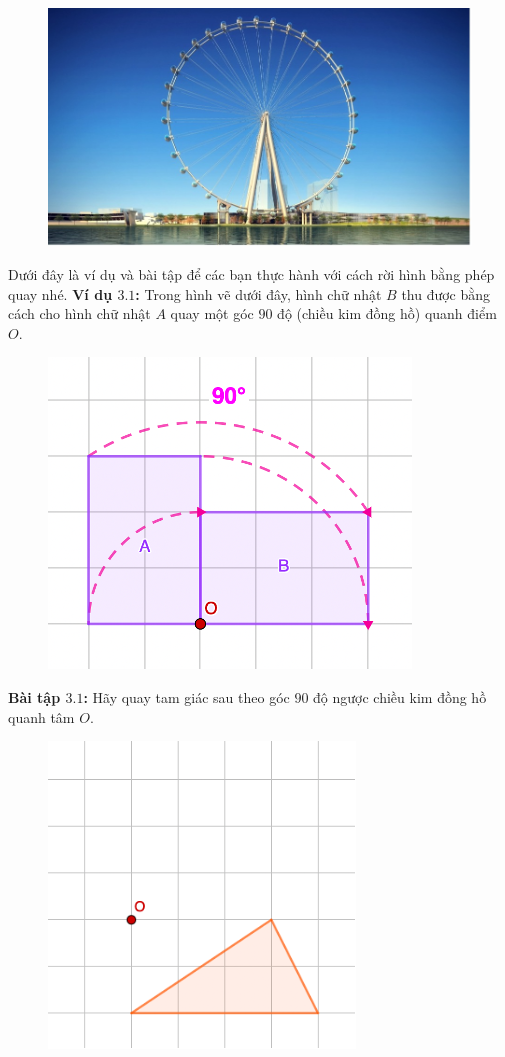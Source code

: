 \begin{multicols}{2}
\begin{figure}[H]
		\includegraphics[width= 0.99\linewidth]{Picture25}
		\vspace*{-10pt}
	\end{figure}
	Dưới đây là ví dụ và bài tập để các bạn thực hành với cách rời hình bằng phép quay nhé.
	\vskip 0.1cm
	\textbf{\color{toancuabi}Ví dụ $\pmb{3.1}$:} Trong hình vẽ dưới đây, hình chữ nhật $B$ thu được bằng cách cho hình chữ nhật $A$ quay một góc $90$ độ (chiều kim đồng hồ) quanh điểm $O$.
	\begin{figure}[H]
		\vspace*{-5pt}
		\centering
		\captionsetup{labelformat= empty, justification=centering}
		\includegraphics[width= 0.58\linewidth]{Picture26}
		\vspace*{-10pt}
	\end{figure}
	\textbf{\color{toancuabi}Bài tập $\pmb{3.1}$:} Hãy quay tam giác sau theo góc $90$ độ ngược chiều kim đồng hồ quanh tâm $O$.
	\begin{figure}[H]
		\vspace*{-5pt}
		\centering
		\captionsetup{labelformat= empty, justification=centering}
		\includegraphics[width= 0.58\linewidth]{Picture27}

\end{figure}
\end{multicols}
